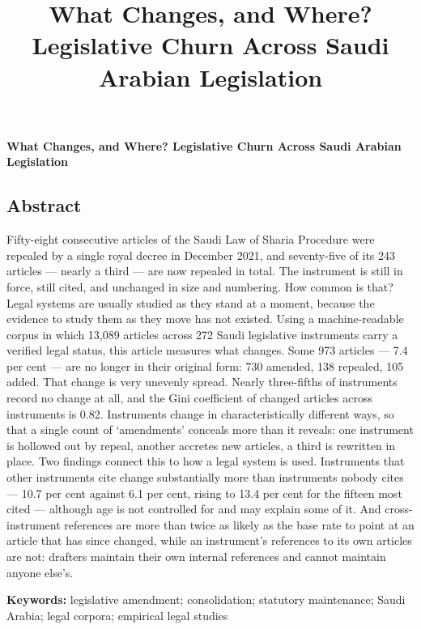 \documentclass[11pt]{article}
\title{What Changes, and Where?\\
Legislative Churn Across Saudi Arabian Legislation}
\author{}
\date{}
\begin{document}
\begin{center}
{\Large\bfseries What Changes, and Where? Legislative Churn Across Saudi Arabian Legislation\par}
\end{center}
\vspace{1em}


\subsection*{Abstract}

\noindent
Fifty-eight consecutive articles of the Saudi Law of Sharia Procedure were
repealed by a single royal decree in December 2021, and seventy-five of its
243 articles --- nearly a third --- are now repealed in total. The instrument
is still in force, still cited, and unchanged in size and numbering. How
common is that? Legal systems are usually studied as they stand at a moment,
because the evidence to study them as they move has not existed. Using a
machine-readable corpus in which 13,089 articles across 272 Saudi legislative
instruments carry a verified legal status, this article measures what
changes. Some 973 articles --- 7.4 per cent --- are no longer in their
original form: 730 amended, 138 repealed, 105 added. That change is very
unevenly spread. Nearly three-fifths of instruments record no change at all,
and the Gini coefficient of changed articles across instruments is 0.82.
Instruments change in characteristically different ways, so that a single
count of `amendments' conceals more than it reveals: one instrument is
hollowed out by repeal, another accretes new articles, a third is rewritten
in place. Two findings connect this to how a legal system is used. Instruments
that other instruments cite change substantially more than instruments nobody
cites --- 10.7 per cent against 6.1 per cent, rising to 13.4 per cent for the
fifteen most cited --- although age is not controlled for and may explain some
of it. And cross-instrument references are more than twice as likely as the
base rate to point at an article that has since changed, while an instrument's
references to its own articles are not: drafters maintain their own internal
references and cannot maintain anyone else's.


\vspace{1em}\noindent\textbf{Keywords:} legislative amendment; consolidation;
statutory maintenance; Saudi Arabia; legal corpora; empirical legal studies
\vspace{1.5em}
\end{document}
